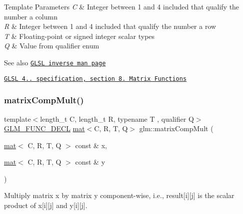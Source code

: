 \begin{DoxyTemplParams}{Template Parameters}
{\em C} & Integer between 1 and 4 included that qualify the number a column \\
\hline
{\em R} & Integer between 1 and 4 included that qualify the number a row \\
\hline
{\em T} & Floating-\/point or signed integer scalar types \\
\hline
{\em Q} & Value from qualifier enum\\
\hline
\end{DoxyTemplParams}
\begin{DoxySeeAlso}{See also}
\href{http://www.opengl.org/sdk/docs/manglsl/xhtml/inverse.xml}{\tt G\+L\+SL inverse man page} 

\href{http://www.opengl.org/registry/doc/GLSLangSpec.4.20.8.pdf}{\tt G\+L\+SL 4.. specification, section 8. Matrix Functions} 
\end{DoxySeeAlso}
\mbox{\label{group__core__func__matrix_gaf14569404c779fedca98d0b9b8e58c1f}} 
\subsubsection{\texorpdfstring{matrix\+Comp\+Mult()}{matrixCompMult()}}
{\footnotesize\ttfamily template$<$length\+\_\+t C, length\+\_\+t R, typename T , qualifier Q$>$ \\
\hyperlink{setup_8hpp_ab2d052de21a70539923e9bcbf6e83a51}{G\+L\+M\+\_\+\+F\+U\+N\+C\+\_\+\+D\+E\+CL} \hyperlink{structglm_1_1mat}{mat}$<$C, R, T, Q$>$ glm\+::matrix\+Comp\+Mult (\begin{DoxyParamCaption}\item[{\hyperlink{structglm_1_1mat}{mat}$<$ C, R, T, Q $>$ const \&}]{x,  }\item[{\hyperlink{structglm_1_1mat}{mat}$<$ C, R, T, Q $>$ const \&}]{y }\end{DoxyParamCaption})}

Multiply matrix x by matrix y component-\/wise, i.\+e., result\mbox{[}i\mbox{]}\mbox{[}j\mbox{]} is the scalar product of x\mbox{[}i\mbox{]}\mbox{[}j\mbox{]} and y\mbox{[}i\mbox{]}\mbox{[}j\mbox{]}.


